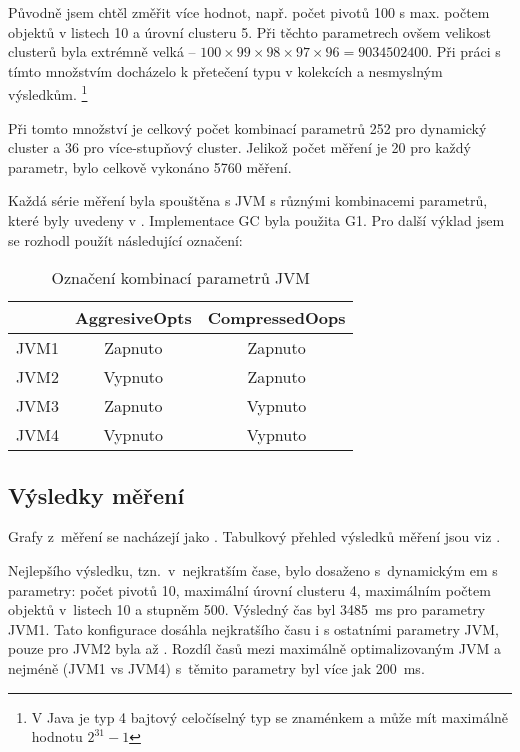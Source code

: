 Původně jsem chtěl změřit více hodnot, např. počet pivotů 100 s max. počtem objektů v listech 10 a úrovní clusteru 5.
Při těchto parametrech ovšem velikost clusterů byla extrémně velká -- $100 \times 99 \times 98 \times 97 \times 96 = 9034502400$.
Při práci s tímto množstvím docházelo k přetečení typu  v kolekcích a nesmyslným výsledkům.
\footnote{V Java je typ  4 bajtový celočíselný typ se znaménkem a může mít maximálně hodnotu $2^{31}-1$}

Při tomto množství je celkový počet kombinací parametrů 252 pro dynamický cluster a 36 pro více-stupňový cluster.
Jelikož počet měření je 20 pro každý parametr, bylo celkově vykonáno 5760 měření.

Každá série měření byla spouštěna s JVM s různými kombinacemi parametrů, které byly uvedeny v .
Implementace GC byla použita G1.
Pro další výklad jsem se rozhodl použít následující označení:

\begin{table}[h]
\center
\begin{tabular}{|l  || c | c |}
\hline
& AggresiveOpts & CompressedOops \\ \hline
\hline
JVM1 & Zapnuto & Zapnuto \\ \hline
JVM2 & Vypnuto & Zapnuto \\ \hline
JVM3 & Zapnuto & Vypnuto \\ \hline
JVM4 & Vypnuto & Vypnuto \\ \hline
\end{tabular}
\caption{Označení kombinací parametrů JVM}
\end{table}

\subsection{Výsledky měření}
Grafy z~měření se nacházejí jako . Tabulkový přehled výsledků měření jsou viz .

Nejlepšího výsledku, tzn.~v~nejkratším čase, bylo dosaženo s~dynamickým \MIndex em s parametry: počet pivotů 10, maximální úrovní clusteru 4, maximálním počtem objektů v~listech 10 a stupněm \BPTree{} 500.
Výsledný čas byl \SI{3485}{\ms} pro parametry JVM1.
Tato konfigurace dosáhla nejkratšího času i s ostatními parametry JVM, pouze pro JVM2 byla až .
Rozdíl časů mezi maximálně optimalizovaným JVM a nejméně (JVM1 vs JVM4) s~těmito parametry byl více jak \SI{200}{\ms}.

